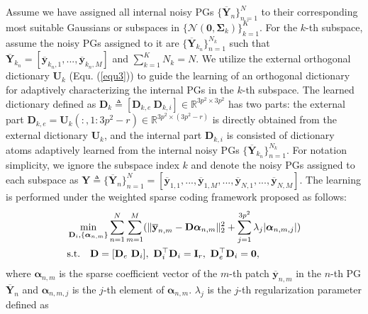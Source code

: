 \documentclass[10pt,twocolumn,letterpaper]{article}
\begin{document}
Assume we have assigned all internal noisy PGs $\{\mathbf{\overline{Y}}_{n}\}_{n=1}^{N}$ to their corresponding most suitable Gaussians or subspaces in $\{\mathcal{N}(\mathbf{0},\mathbf{\Sigma}_{k})\}_{k=1}^{K}$. For the $k$-th subspace, assume the noisy PGs assigned to it are $\{\mathbf{\overline{Y}}_{k_{n}}\}_{n=1}^{N_{k}}$ such that $\mathbf{\overline{Y}}_{k_{n}}=[\mathbf{\overline{y}}_{k_{n},1},...,\mathbf{\overline{y}}_{k_{n},M}]$ and $\sum_{k=1}^{K}N_{k}=N$. We utilize the external orthogonal dictionary $\mathbf{U}_{k}$ (Equ. (\ref{equ3})) to guide the learning of an orthogonal dictionary for adaptively characterizing the internal PGs in the $k$-th subspace. The learned dictionary defined as $\mathbf{D}_{k}\triangleq[\mathbf{D}_{k,e}\ \mathbf{D}_{k,i}]\in \mathbb{R}^{3p^2\times 3p^2}$ has two parts: the external part $\mathbf{D}_{k,e}=\mathbf{U}_{k}(:,1:3p^2-r)\in\mathbb{R}^{3p^2\times (3p^2-r)}$ is directly obtained from the external dictionary $\mathbf{U}_{k}$, and the internal part $\mathbf{D}_{k,i}$ is consisted of dictionary atoms adaptively learned from the internal noisy PGs $\{\mathbf{\overline{Y}}_{k_{n}}\}_{n=1}^{N_{k}}$. For notation simplicity, we ignore the subspace index $k$ and denote the noisy PGs assigned to each subspace as $\mathbf{Y}\triangleq\{\mathbf{\overline{Y}}_{n}\}_{n=1}^{N} = [\mathbf{\overline{y}}_{1,1},...,\mathbf{\overline{y}}_{1,M},...,\mathbf{\overline{y}}_{N,1},...,\mathbf{\overline{y}}_{N,M}]$. The learning is performed under the weighted sparse coding framework proposed as follows:
\vspace{-2mm}
\begin{equation}\label{equ5}\vspace{-3mm}
\begin{split}
&\min_{\mathbf{D}_{i},\{\bm{\alpha}_{n,m}\}}
\sum_{n=1}^{N}\sum_{m=1}^{M}(\|\mathbf{\overline{y}}_{n,m}-\mathbf{D}\bm{\alpha}_{n,m}\|_{2}^{2}+\sum_{j=1}^{3p^{2}}\lambda_{j}|\bm{\alpha}_{n,m,j}|)
\\
&
\text{s.t.}
\quad
\mathbf{D}=[\mathbf{D}_{e}\ \mathbf{D}_{i}],\ \mathbf{D}_{i}^{\top}\mathbf{D}_{i} = \mathbf{I}_{r},\ \mathbf{D}_{e}^{\top}\mathbf{D}_{i} = \mathbf{0},
\end{split}
\end{equation}
where $\bm{\alpha}_{n,m}$ is the sparse coefficient vector of the $m$-th patch $\mathbf{\overline{y}}_{n,m}$ in the $n$-th PG $\mathbf{\overline{Y}}_{n}$ and $\bm{\alpha}_{n,m,j}$ is the $j$-th element of $\bm{\alpha}_{n,m}$. $\lambda_{j}$ is the $j$-th regularization parameter defined as
\vspace{-1mm}
\end{document}
